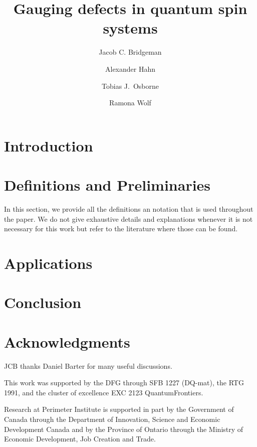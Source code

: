 

\title{Gauging defects in quantum spin systems}
\author{Jacob C. Bridgeman}
\author{Alexander Hahn}
\author{Tobias J.\ Osborne}
\author{Ramona Wolf}

\address{Perimeter Institute for Theoretical Physics, Waterloo, Ontario, Canada}
\address{Institut für Theoretische Physik, Leibniz Universität Hannover, Hannover, Germany}


\newcommand{\jcb}[1]{\textcolor{blue}{#1}}



\maketitle

\begin{abstract}
	
\end{abstract}

\section{Introduction}


\section{Definitions and Preliminaries}\label{S:defs}
In this section, we provide all the definitions an notation that is used throughout the paper. We do not give exhaustive details and explanations whenever it is not necessary for this work but refer to the literature where those can be found.







\section{Applications}



\section{Conclusion}

\section*{Acknowledgments}
JCB thanks Daniel Barter for many useful discussions.

This work was supported by the DFG through SFB 1227 (DQ-mat), the RTG 1991, and the cluster of excellence EXC 2123 QuantumFrontiers.

Research at Perimeter Institute is supported in part by the Government of Canada through the Department of Innovation, Science and Economic Development Canada and by the Province of Ontario through the Ministry of Economic Development, Job Creation and Trade.



